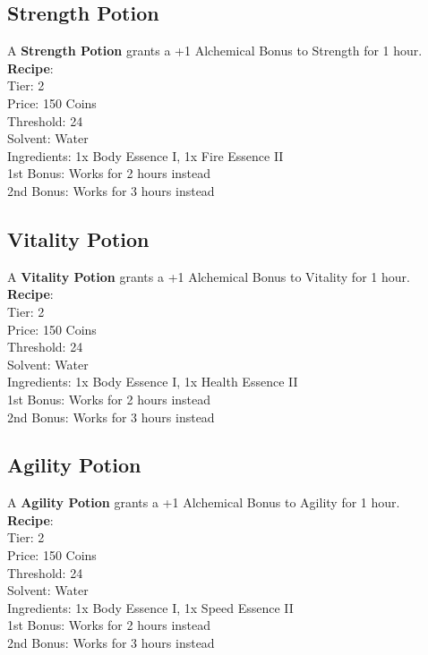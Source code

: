 \subsection{Strength Potion}\label{potion:strengthPotion}
A \textbf{Strength Potion} grants a +1 Alchemical Bonus to Strength for 1 hour.\\
\textbf{Recipe}:\\
Tier: 2\\
Price: 150 Coins\\
Threshold: 24\\
Solvent: Water\\
Ingredients: 1x Body Essence I, 1x Fire Essence II\\
1st Bonus: Works for 2 hours instead\\
2nd Bonus: Works for 3 hours instead\\

\subsection{Vitality Potion}\label{potion:vitalityPotion}
A \textbf{Vitality Potion} grants a +1 Alchemical Bonus to Vitality for 1 hour.\\
\textbf{Recipe}:\\
Tier: 2\\
Price: 150 Coins\\
Threshold: 24\\
Solvent: Water\\
Ingredients: 1x Body Essence I, 1x Health Essence II\\
1st Bonus: Works for 2 hours instead\\
2nd Bonus: Works for 3 hours instead\\

\subsection{Agility Potion}\label{potion:agilityPotion}
A \textbf{Agility Potion} grants a +1 Alchemical Bonus to Agility for 1 hour.\\
\textbf{Recipe}:\\
Tier: 2\\
Price: 150 Coins\\
Threshold: 24\\
Solvent: Water\\
Ingredients: 1x Body Essence I, 1x Speed Essence II\\
1st Bonus: Works for 2 hours instead\\
2nd Bonus: Works for 3 hours instead\\


